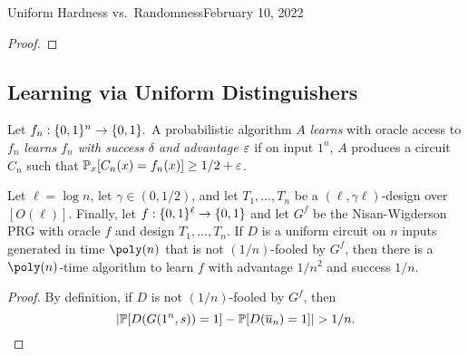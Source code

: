 \begin{lecture}{4}{Uniform Hardness vs.\ Randomness}{February 10, 2022}
\begin{proof}
\end{proof}

\subsection{Learning via Uniform Distinguishers}


\begin{definition}
  Let $f_n : \{0, 1\}^n \to \{0, 1\}.$ A probabilistic algorithm $A$
  \emph{learns} with oracle access to $f_n$ \emph{learns $f_n$ with success
  $\delta$ and advantage $\varepsilon$} if on input $1^n$, $A$ produces a circuit
  $C_n$ such that $\mathbb{P}_x [C_n(x) = f_n(x)] \geq 1/2 + \varepsilon$.
\end{definition}

\begin{proposition}
  \label{prop:learning}
  Let $\ell = \log{n}$, let $\gamma \in (0, 1/2)$, and let $T_1, \dots, T_n$ be
  a $(\ell, \gamma \ell)$-design over $[O(\ell)]$. Finally, let $f :
  \{0,1\}^\ell \to \{0, 1\}$ and let $G^f$ be the Nisan-Wigderson PRG with
  oracle $f$ and design $T_1, \dots, T_n$. If $D$ is a uniform circuit on $n$
  inputs generated in time $\poly(n)$ that is not $(1/n)$-fooled by $G^f$, then
  there is a $\poly(n)$-time algorithm to learn $f$ with advantage $1/n^2$ and
  success $1/n$.
\end{proposition}

\begin{proof}
  By definition, if $D$ is not $(1/n)$-fooled by $G^f$, then
	\[
		\lvert\mathbb{P}[D(G(1^n, s)) = 1] - \mathbb{P}[D(\overline{u}_n) = 1]\rvert > 1/n.
	\]


\end{proof}
\end{lecture}
